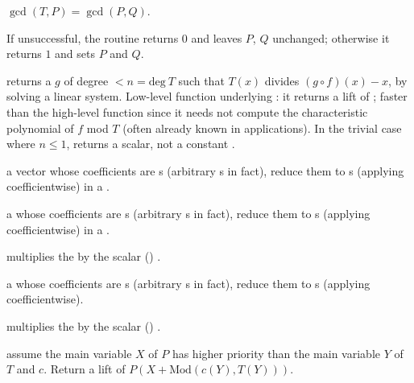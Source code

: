 \item $\gcd(T,P) = \gcd(P,Q)$.

\noindent If unsuccessful, the routine returns $0$ and leaves $P$, $Q$
unchanged; otherwise it returns $1$ and sets $P$ and $Q$.

 returns a  $g$ of degree $< n
= \text{deg}~T$ such that $T(x)$ divides $(g \circ f)(x) - x$, by solving a
linear system. Low-level function underlying : it returns a
lift of \kbd[modreverse(f,T)]; faster than the high-level function since it
needs not compute the characteristic polynomial of $f$ mod $T$ (often already
known in applications). In the trivial case where $n \leq 1$, returns a
scalar, not a constant .


  a vector whose
coefficients are s (arbitrary s in fact), reduce them to
s (applying  coefficientwise) in a .

  a  whose
coefficients are s (arbitrary s in fact), reduce them to
s (applying  coefficientwise) in a .

  multiplies the
   by the scalar () .


  a  whose
coefficients are s (arbitrary s in fact), reduce them to
s (applying  coefficientwise).


 multiplies the 
 by the scalar () .





 assume the main variable
$X$ of $P$ has higher priority than the main variable $Y$ of $T$ and $c$.
Return a lift of $P(X+\text{Mod}(c(Y), T(Y)))$.

